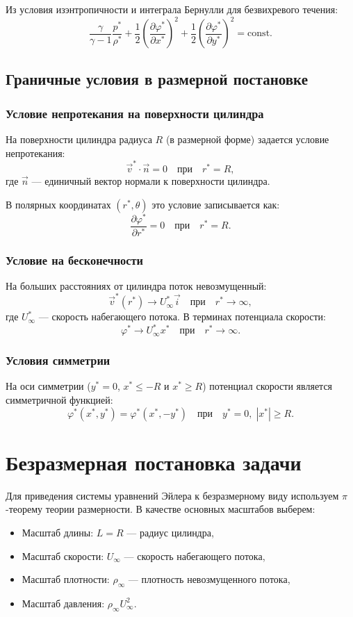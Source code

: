 \documentclass[a4paper,12pt]{article}
\begin{document}
	Из условия изэнтропичности и интеграла Бернулли для безвихревого течения:
	\[
	\frac{\gamma}{\gamma-1} \frac{p^*}{\rho^*} + \frac{1}{2} \left( \frac{\partial \varphi^*}{\partial x^*} \right)^2 + \frac{1}{2} \left( \frac{\partial \varphi^*}{\partial y^*} \right)^2 = \text{const}.
	\]
	
	\subsection{Граничные условия в размерной постановке}
	
	\subsubsection{Условие непротекания на поверхности цилиндра}
	На поверхности цилиндра радиуса $R$ (в размерной форме) задается условие непротекания:
	\[
	\vec{v}^* \cdot \vec{n} = 0 \quad \text{при} \quad r^* = R,
	\]
	где $\vec{n}$ — единичный вектор нормали к поверхности цилиндра.
	
	В полярных координатах $(r^*, \theta)$ это условие записывается как:
	\[
	\frac{\partial \varphi^*}{\partial r^*} = 0 \quad \text{при} \quad r^* = R.
	\]
	
	\subsubsection{Условие на бесконечности}
	На больших расстояниях от цилиндра поток невозмущенный:
	\[
	\vec{v}^*(r^*) \to U_\infty^* \vec{i} \quad \text{при} \quad r^* \to \infty,
	\]
	где $U_\infty^*$ — скорость набегающего потока. В терминах потенциала скорости:
	\[
	\varphi^* \to U_\infty^* x^* \quad \text{при} \quad r^* \to \infty.
	\]
	
	\subsubsection{Условия симметрии}
	На оси симметрии ($y^* = 0$, $x^* \le -R$ и $x^* \ge R$) потенциал скорости является симметричной функцией:
	\[
	\varphi^*(x^*, y^*) = \varphi^*(x^*, -y^*) \quad \text{при} \quad y^* = 0, \; |x^*| \ge R.
	\]
	
	\section{Безразмерная постановка задачи}
	
	Для приведения системы уравнений Эйлера к безразмерному виду используем $\pi$-теорему теории размерности. В качестве основных масштабов выберем:
	\begin{itemize}
		\item Масштаб длины: $L = R$ — радиус цилиндра,
		\item Масштаб скорости: $U_\infty$ — скорость набегающего потока,
		\item Масштаб плотности: $\rho_\infty$ — плотность невозмущенного потока,
		\item Масштаб давления: $\rho_\infty U_\infty^2$.
	\end{itemize}
	
\end{document}
